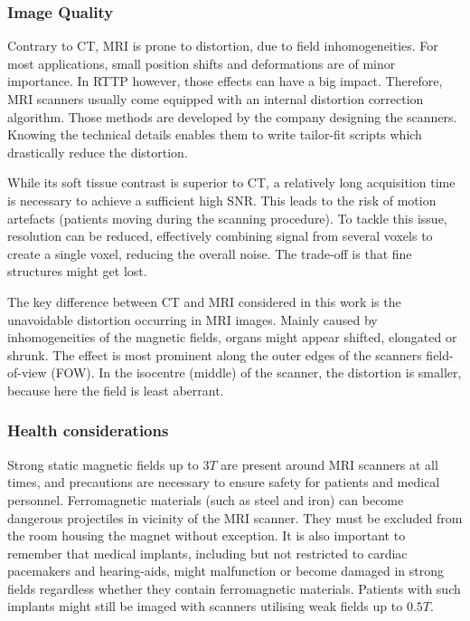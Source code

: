 \subsubsection{Image Quality}
Contrary to CT, MRI is prone to distortion, due to field inhomogeneities.
For most applications, small position shifts and deformations are of minor importance.
In RTTP however, those effects can have a big impact.
Therefore, MRI scanners usually come equipped with an internal distortion correction algorithm.
Those methods are developed by the company designing the scanners.
Knowing the technical details enables them to write tailor-fit scripts which drastically reduce the distortion.

While its soft tissue contrast is superior to CT, a relatively long acquisition time is necessary to achieve a sufficient high SNR.
This leads to the risk of motion artefacts (patients moving during the scanning procedure).
To tackle this issue, resolution can be reduced, effectively combining signal from several voxels to create a single voxel, reducing the overall noise.
The trade-off is that fine structures might get lost.

The key difference between CT and MRI considered in this work is the unavoidable distortion occurring in MRI images.
Mainly caused by inhomogeneities of the magnetic fields, organs might appear shifted, elongated or shrunk.
The effect is most prominent along the outer edges of the scanners field-of-view (FOW).
In the isocentre (middle) of the scanner, the distortion is smaller, because here the field is least aberrant.




\subsubsection{Health considerations}

Strong static magnetic fields up to $3T$ are present around MRI scanners at all times, and precautions are necessary to ensure safety for patients and medical personnel.
Ferromagnetic materials (such as steel and iron) can become dangerous projectiles in vicinity of the MRI scanner.
They must be excluded from the room housing the magnet without exception.
It is also important to remember that medical implants, including but not restricted to cardiac pacemakers and hearing-aids, might malfunction or become damaged in strong fields regardless whether they contain ferromagnetic materials.
Patients with such implants might still be imaged with scanners utilising weak fields up to $0.5T$.


